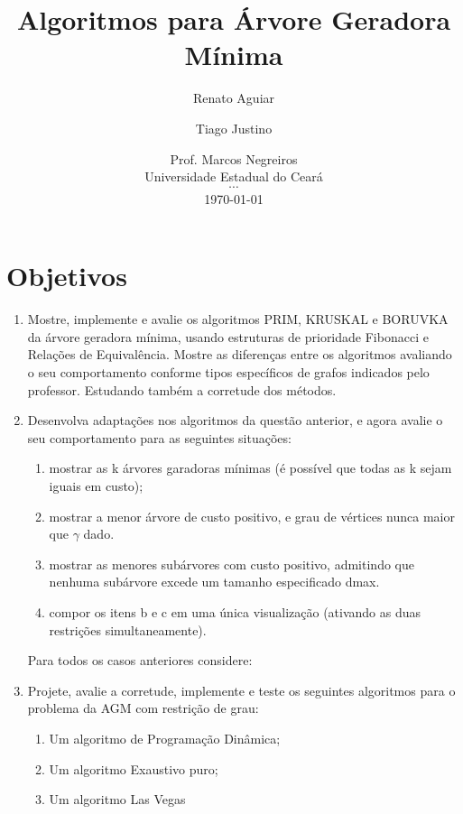 \documentclass[12pt,a4paper]{article}
\title{Algoritmos para Árvore Geradora Mínima}
\author{ Renato Aguiar \and Tiago Justino }
\date{
    Prof. Marcos Negreiros \\
	Universidade Estadual do Ceará \\
	$\cdots$ \\
	\today
}
\begin{document}
\maketitle

\tableofcontents
\pagebreak

\section{Objetivos}

\begin{enumerate}
\item Mostre, implemente e avalie os algoritmos PRIM, KRUSKAL e BORUVKA da árvore
geradora mínima, usando estruturas de prioridade Fibonacci e Relações de
Equivalência. Mostre as diferenças entre os algoritmos avaliando o seu
comportamento conforme tipos específicos de grafos indicados pelo professor.
Estudando também a corretude dos métodos.

\item Desenvolva adaptações nos algoritmos da questão anterior, e agora avalie o
seu comportamento para as seguintes situações:

\begin{enumerate}
\item mostrar as k árvores garadoras mínimas (é possível que todas as k sejam
iguais em custo);

\item mostrar a menor árvore de custo positivo, e grau de vértices nunca maior
que $\gamma$ dado.

\item mostrar as menores subárvores com custo positivo, admitindo que nenhuma
subárvore excede um tamanho especificado dmax.

\item compor os itens b e c em uma única visualização (ativando as duas
restrições simultaneamente).
\end{enumerate}

Para todos os casos anteriores considere:


\item Projete, avalie a corretude, implemente e teste os seguintes algoritmos
para o problema da AGM com restrição de grau:

\begin{enumerate}
\item Um algoritmo de Programação Dinâmica;
\item Um algoritmo Exaustivo puro;
\item Um algoritmo Las Vegas
\end{enumerate}

\end{enumerate}
\end{document}
